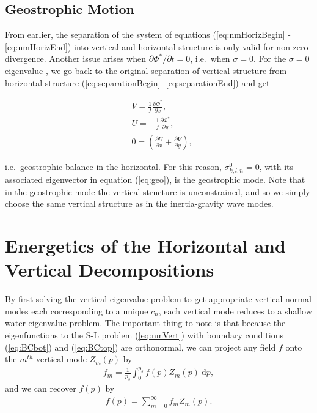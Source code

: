 \subsection{Geostrophic Motion}
\label{sec:geostrophicMotion}
From earlier, the separation of the system of equations (\ref{eq:nmHorizBegin} - \ref{eq:nmHorizEnd}) into vertical and horizontal structure is only valid for non-zero divergence. Another issue arises when $\partial \Phi^*/\partial t = 0$, i.e.\ when $\sigma = 0$. For the $\sigma = 0$ eigenvalue , we go back to the original separation of vertical structure from horizontal structure (\ref{eq:separationBegin}- \ref{eq:separationEnd}) and get 

\begin{align}
&V = \frac{1}{f} \frac{\partial \Phi^*}{\partial x},\label{eq:geoVertBegin}\\
&U = -\frac{1}{f} \frac{\partial \Phi^*}{\partial y},\\
&0 = \left(\frac{\partial U}{\partial x} + \frac{\partial V}{\partial y}\right),\label{eq:geoVertEnd}
\end{align}

i.e.\ geostrophic balance in the horizontal. For this reason, $\sigma^0_{k,l,n} = 0$, with its associated eigenvector in equation (\ref{eq:geo}), is the geostrophic mode. Note that in the geostrophic mode the vertical structure is unconstrained, and so we simply choose the same vertical structure as in the inertia-gravity wave modes.

\section{Energetics of the Horizontal and Vertical Decompositions}
\label{sec:energy}
By first solving the vertical eigenvalue problem to get appropriate vertical normal modes each corresponding to a unique $c_n$, each vertical mode reduces to a shallow water eigenvalue problem. The important thing to note is that because the eigenfunctions to the S-L problem (\ref{eq:nmVert}) with boundary conditions (\ref{eq:BCbot}) and (\ref{eq:BCtop}) are orthonormal, we can project any field $f$ onto the $m^{th}$ vertical mode $Z_m(p)$ by 
\begin{align}
f_m = \frac{1}{p_s} \int_0^{p_s} f(p) Z_m(p) ~\text{d}p,
\end{align}
and we can recover $f(p)$ by 
\begin{align}
f(p) = \sum_{m=0}^{\infty} f_m Z_m(p) .\label{eq:reconstruction}
\end{align}

